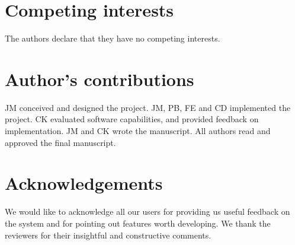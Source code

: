 \documentclass{bmcart}
\begin{document}
\begin{backmatter}

\section*{Competing interests}
The authors declare that they have no competing interests.

\section*{Author's contributions}
JM conceived and designed the project. JM, PB, FE and CD implemented the project.
CK evaluated software capabilities, and provided feedback on implementation. JM
and CK wrote the manuscript. All authors read and approved the final manuscript.

\section*{Acknowledgements}
We would like to acknowledge all our users for providing us useful feedback on
the system and for pointing out features worth developing. We thank the
reviewers for their insightful and constructive comments. 





\end{backmatter}
\end{document}
